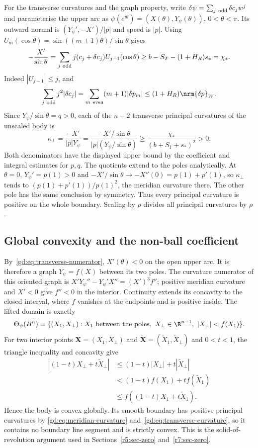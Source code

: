 For the transverse curvatures and the graph property, write
$\delta\psi=\sum_{j\ {\rm odd}}\delta c_jw^j$ and parameterise the upper arc as
$\psi(e^{i\theta})=(X(\theta),Y_\psi(\theta))$, $0<\theta<\pi$.
Its outward normal is $(Y_\psi',-X')/|p|$ and speed is $|p|$.
Using $U_m(\cos\theta)=\sin((m+1)\theta)/\sin\theta$ gives
\begin{equation}\label{gd:eq:transverse-numerator}
 -\frac{X'}{\sin\theta}
 =\sum_{j\ {\rm odd}}j(c_j+\delta c_j)U_{j-1}(\cos\theta)
 \ge b-S_T-(1+H_R)s_*=\chi_* .
\end{equation}
Indeed $|U_{j-1}|\le j$, and
\[
 \sum_{j\ {\rm odd}}j^2|\delta c_j|
 =\sum_{m\ {\rm even}}(m+1)|\delta p_m|
 \le(1+H_R)\nrm{\delta p}_W.
\]
Since $Y_\psi/\sin\theta=q>0$, each of the $n-2$ transverse principal
curvatures of the unscaled body is
\begin{equation}\label{gd:eq:transverse-curvature}
 \kappa_\perp=\frac{-X'}{|p|Y_\psi}
 =\frac{-X'/\sin\theta}{|p|(Y_\psi/\sin\theta)}
 \ge\frac{\chi_*}{(b+S_1+s_*)^2}>0.
\end{equation}
Both denominators have the displayed upper bound by the coefficient
and integral estimates for $p,q$.
The quotients extend to the poles analytically.
At $\theta=0$, $Y_\psi'=p(1)>0$ and
$-X'/\sin\theta\to-X''(0)=p(1)+p'(1)$, so
$\kappa_\perp$ tends to
$(p(1)+p'(1))/p(1)^2$, the meridian curvature there.
The other pole has the same conclusion by symmetry.
Thus every principal curvature is positive on the whole boundary.
Scaling by $\rho$ divides all principal curvatures by $\rho$.

\subsection{Global convexity and the non-ball coefficient}
\label{gd:sec:global}
By~\eqref{gd:eq:transverse-numerator}, $X'(\theta)<0$ on the open
upper arc. It is therefore a graph $Y_\psi=f(X)$ between its two poles.
The curvature numerator of this oriented graph is
$X'Y_\psi''-Y_\psi'X''=(X')^3f''$; positive meridian curvature and $X'<0$
give $f''<0$ in the interior. Continuity extends its concavity to the
closed interval, where $f$ vanishes at the endpoints and is positive
inside. The lifted domain is exactly
\[
 \Theta_\psi(B^n)=\{(X_1,X_\perp):X_1\text{ between the poles},\
                 X_\perp\in\R^{n-1},\ |X_\perp|<f(X_1)\}.
\]
For two interior points $\mathbf X=(X_1,X_\perp)$ and
$\tilde{\mathbf X}=(\tilde X_1,\tilde X_\perp)$ and $0<t<1$,
the triangle inequality and concavity give
\[
 \begin{split}
 |(1-t)X_\perp+t\tilde X_\perp|
 &\le(1-t)|X_\perp|+t|\tilde X_\perp|\\
 &<(1-t)f(X_1)+tf(\tilde X_1)\\
 &\le f((1-t)X_1+t\tilde X_1).
 \end{split}
\]
Hence the body is convex globally.
Its smooth boundary has positive principal curvatures by
\eqref{gd:eq:meridian-curvature} and~\eqref{gd:eq:transverse-curvature},
so it contains no boundary line segment and is strictly convex.
This is the solid-of-revolution argument used in
Sections~\ref{r5:sec-zero} and~\ref{r7:sec-zero}.

